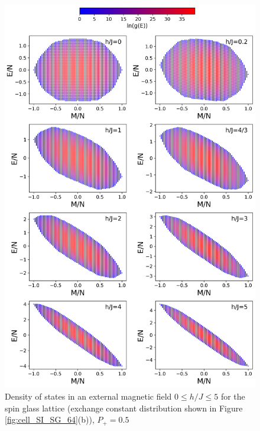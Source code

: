 \documentclass[preprint,12pt]{elsarticle}
\begin{document}
\begin{figure}[H]
		\centering
		\includegraphics[width=1\linewidth]{pictures/HDOS_SG_64_J0.png}
	\caption{Density of states in an external magnetic field $0\leq h/J \leq 5$ for the spin glass lattice (exchange constant distribution shown in Figure \ref{fig:cell_SI_SG_64}(b)), $P_+ = 0.5$}
	\label{fig:HDOS_glass}
\end{figure}
\end{document}
